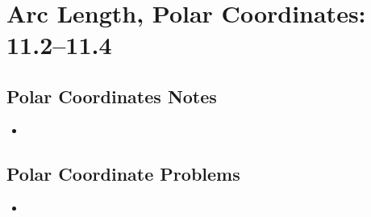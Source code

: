 \chapter{Arc Length, Polar Coordinates: 11.2--11.4}
\section{Polar Coordinates Notes}
\begin{itemize}
  \item
\end{itemize}

\section{Polar Coordinate Problems}
\begin{itemize}
  \item
\end{itemize}

